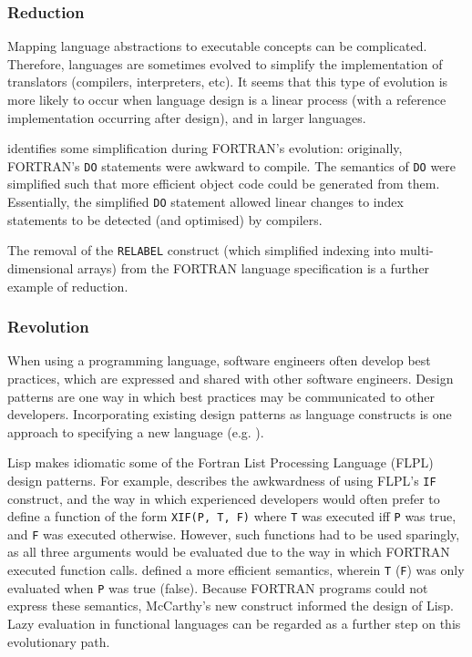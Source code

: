 \subsubsection{Reduction}
Mapping language abstractions to executable concepts can be complicated. Therefore, languages are sometimes evolved to simplify the implementation of translators (compilers, interpreters, etc). It seems that this type of evolution is more likely to occur when language design is a linear process (with a reference implementation occurring after design), and in larger languages.

\cite{backus78history} identifies some simplification during FORTRAN's evolution: originally, FORTRAN's \verb|DO| statements were awkward to compile. The semantics of \verb|DO| were simplified such that more efficient object code could be generated from them. Essentially, the simplified \verb|DO| statement allowed linear changes to index statements to be detected (and optimised) by compilers.

The removal of the \verb|RELABEL| construct (which simplified indexing into multi-dimensional arrays) from the FORTRAN language specification \cite{backus78history} is a further example of reduction.

\subsubsection{Revolution}
When using a programming language, software engineers often develop best practices, which are expressed and shared with other software engineers. Design patterns are one way in which best practices may be communicated to other developers. Incorporating existing design patterns as language constructs is one approach to specifying a new language (e.g. \cite{bosch98patterns}).

Lisp makes idiomatic some of the Fortran List Processing Language (FLPL) design patterns. For example, \cite{mcarthy78lisp} describes the awkwardness of using FLPL's \verb|IF| construct, and the way in which experienced developers would often prefer to define a function of the form \verb|XIF(P, T, F)| where \verb|T| was executed iff \verb|P| was true, and \verb|F| was executed otherwise. However, such functions had to be used sparingly, as all three arguments would be evaluated due to the way in which FORTRAN executed function calls. \cite{mcarthy78lisp} defined a more efficient semantics, wherein \verb|T| (\verb|F|) was only evaluated when  \verb|P| was true (false). Because FORTRAN programs could not express these semantics, McCarthy's new construct informed the design of Lisp. Lazy evaluation in functional languages can be regarded as a further step on this evolutionary path.


